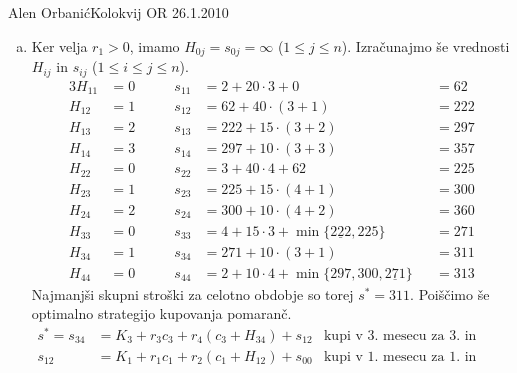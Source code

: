 \begin{naloga}{Alen Orbanić}{Kolokvij OR 26.1.2010}
\begin{odgovor}
\begin{enumerate}[(a)]
\item Ker velja $r_1 > 0$, imamo $H_{0j} = s_{0j} = \infty$ ($1 \le j \le n$).
Izračunajmo še vrednosti $H_{ij}$ in $s_{ij}$ ($1 \le i \le j \le n$).
\begin{alignat*}{3}
H_{11} &= 0 &\qquad s_{11} &= 2 + 20 \cdot 3 + 0 &&= 62 \\
H_{12} &= 1 &\qquad s_{12} &= 62 + 40 \cdot (3 + 1) &&= 222 \\
H_{13} &= 2 &\qquad s_{13} &= 222 + 15 \cdot (3 + 2) &&= 297 \\
H_{14} &= 3 &\qquad s_{14} &= 297 + 10 \cdot (3 + 3) &&= 357 \\
H_{22} &= 0 &\qquad s_{22} &= 3 + 40 \cdot 4 + 62 &&= 225 \\
H_{23} &= 1 &\qquad s_{23} &= 225 + 15 \cdot (4 + 1) &&= 300 \\
H_{24} &= 2 &\qquad s_{24} &= 300 + 10 \cdot (4 + 2) &&= 360 \\
H_{33} &= 0 &\qquad s_{33} &= 4 + 15 \cdot 3 + \min\{\underline{222}, 225\} &&= 271 \\
H_{34} &= 1 &\qquad s_{34} &= 271 + 10 \cdot (3 + 1) &&= 311 \\
H_{44} &= 0 &\qquad s_{44} &= 2 + 10 \cdot 4 + \min\{297, 300, \underline{271}\} &&= 313
\end{alignat*}
Najmanjši skupni stroški za celotno obdobje so torej $s^* = 311$.
Poiščimo še optimalno strategijo kupovanja pomaranč.
\begin{align*}
s^* = s_{34} &= K_3 + r_3 c_3 + r_4 (c_3 + H_{34}) + s_{12} & \text{kupi v 3.~mesecu za 3.~in 4.~mesec} \\
s_{12} &= K_1 + r_1 c_1 + r_2 (c_1 + H_{12}) + s_{00} & \text{kupi v 1.~mesecu za 1.~in 2.~mesec}
\end{align*}
\end{enumerate}
\end{odgovor}
\end{naloga}
